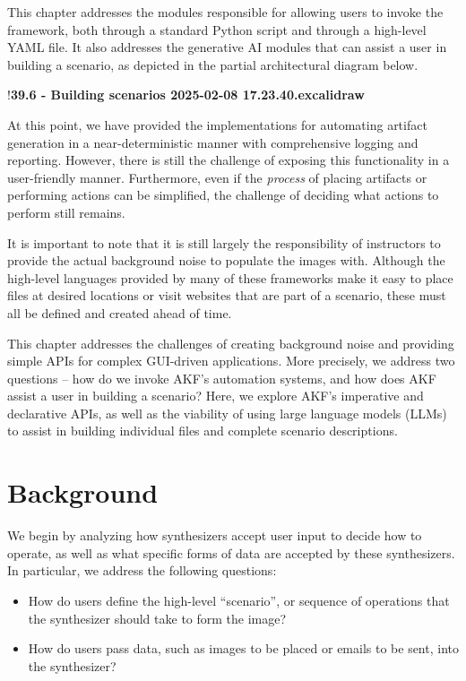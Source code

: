 This chapter addresses the modules responsible for allowing users to
invoke the framework, both through a standard Python script and through
a high-level YAML file. It also addresses the generative AI modules that
can assist a user in building a scenario, as depicted in the partial
architectural diagram below.

!\textbf{39.6 - Building scenarios 2025-02-08 17.23.40.excalidraw}

At this point, we have provided the implementations for automating
artifact generation in a near-deterministic manner with comprehensive
logging and reporting. However, there is still the challenge of exposing
this functionality in a user-friendly manner. Furthermore, even if the
\emph{process} of placing artifacts or performing actions can be
simplified, the challenge of deciding what actions to perform still
remains.

It is important to note that it is still largely the responsibility of
instructors to provide the actual background noise to populate the
images with. Although the high-level languages provided by many of these
frameworks make it easy to place files at desired locations or visit
websites that are part of a scenario, these must all be defined and
created ahead of time.

This chapter addresses the challenges of creating background noise and
providing simple APIs for complex GUI-driven applications. More
precisely, we address two questions -- how do we invoke AKF's automation
systems, and how does AKF assist a user in building a scenario? Here, we
explore AKF's imperative and declarative APIs, as well as the viability
of using large language models (LLMs) to assist in building individual
files and complete scenario descriptions.

\section{Background}\label{background}

We begin by analyzing how synthesizers accept user input to decide how
to operate, as well as what specific forms of data are accepted by these
synthesizers. In particular, we address the following questions:

\begin{itemize}
\tightlist
\item
  How do users define the high-level ``scenario'', or sequence of
  operations that the synthesizer should take to form the image?
\item
  How do users pass data, such as images to be placed or emails to be
  sent, into the synthesizer?
\end{itemize}


